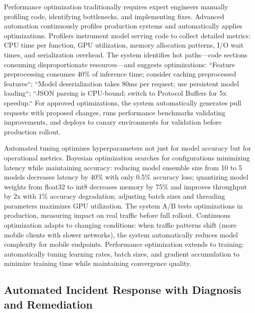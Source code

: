 Performance optimization traditionally requires expert engineers manually profiling code, identifying bottlenecks, and implementing fixes. Advanced automation continuously profiles production systems and automatically applies optimizations. Profilers instrument model serving code to collect detailed metrics: CPU time per function, GPU utilization, memory allocation patterns, I/O wait times, and serialization overhead. The system identifies hot paths---code sections consuming disproportionate resources---and suggests optimizations: ``Feature preprocessing consumes 40\% of inference time; consider caching preprocessed features``; ``Model deserialization takes 80ms per request; use persistent model loading``; ``JSON parsing is CPU-bound; switch to Protocol Buffers for 5x speedup.`` For approved optimizations, the system automatically generates pull requests with proposed changes, runs performance benchmarks validating improvements, and deploys to canary environments for validation before production rollout.

Automated tuning optimizes hyperparameters not just for model accuracy but for operational metrics. Bayesian optimization searches for configurations minimizing latency while maintaining accuracy: reducing model ensemble size from 10 to 5 models decreases latency by 40\% with only 0.5\% accuracy loss; quantizing model weights from float32 to int8 decreases memory by 75\% and improves throughput by 2x with 1\% accuracy degradation; adjusting batch sizes and threading parameters maximizes GPU utilization. The system A/B tests optimizations in production, measuring impact on real traffic before full rollout. Continuous optimization adapts to changing conditions: when traffic patterns shift (more mobile clients with slower networks), the system automatically reduces model complexity for mobile endpoints. Performance optimization extends to training: automatically tuning learning rates, batch sizes, and gradient accumulation to minimize training time while maintaining convergence quality.

\subsection{Automated Incident Response with Diagnosis and Remediation}

